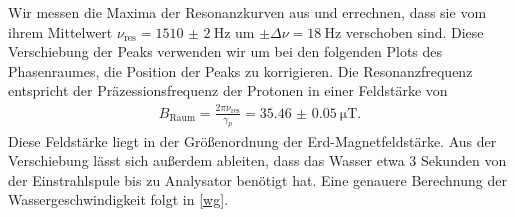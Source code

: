 \documentclass[paper=a4,
	fontsize=10pt,
	DIV=18,
	twocolumn,
	parskip=half
	]{scrartcl}
\numberwithin{equation}{section}    %
\begin{document}
Wir messen die Maxima der Resonanzkurven aus und errechnen, dass sie vom ihrem Mittelwert $\nu_{\mathrm{res}}=\SI{1510(2)}{\hertz}$ um  $\pm \Delta \nu=\SI{18}{\hertz}$ verschoben sind.
Diese Verschiebung der Peaks verwenden wir um bei den folgenden Plots des Phasenraumes, die Position der Peaks zu korrigieren.
Die Resonanzfrequenz entspricht der Präzessionsfrequenz der Protonen in einer Feldstärke von 
\begin{align}
	B_{\mathrm{Raum}}=\frac{2 \pi \nu_{\mathrm{res}}}{\gamma_p}=\SI[separate-uncertainty=false]{35.46(5)}{\micro\tesla}.
\end{align}
Diese Feldstärke liegt in der Größenordnung der Erd-Magnetfeldstärke.
Aus der Verschiebung lässt sich außerdem ableiten, dass das Wasser etwa $3$ Sekunden von der Einstrahlspule bis zu Analysator benötigt hat.
Eine genauere Berechnung der Wassergeschwindigkeit folgt in \ref{wg}.
\end{document}
